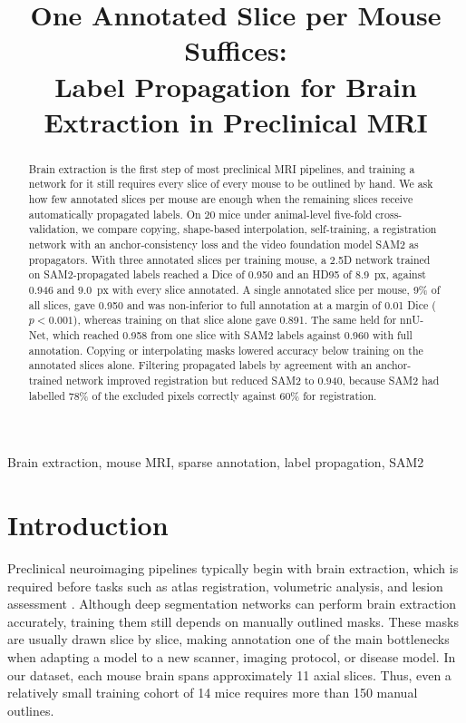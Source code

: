 \documentclass{article}
\title{One Annotated Slice per Mouse Suffices:\\Label Propagation for Brain Extraction in Preclinical MRI}
\begin{document}
\maketitle

\begin{abstract}
Brain extraction is the first step of most preclinical MRI pipelines, and training a network for it still requires every slice of every mouse to be outlined by hand. We ask how few annotated slices per mouse are enough when the remaining slices receive automatically propagated labels. On 20 mice under animal-level five-fold cross-validation, we compare copying, shape-based interpolation, self-training, a registration network with an anchor-consistency loss and the video foundation model SAM2 as propagators. With three annotated slices per training mouse, a 2.5D network trained on SAM2-propagated labels reached a Dice of 0.950 and an HD95 of 8.9~px, against 0.946 and 9.0~px with every slice annotated. A single annotated slice per mouse, 9\% of all slices, gave 0.950 and was non-inferior to full annotation at a margin of 0.01 Dice ($p<0.001$), whereas training on that slice alone gave 0.891. The same held for nnU-Net, which reached 0.958 from one slice with SAM2 labels against 0.960 with full annotation. Copying or interpolating masks lowered accuracy below training on the annotated slices alone. Filtering propagated labels by agreement with an anchor-trained network improved registration but reduced SAM2 to 0.940, because SAM2 had labelled 78\% of the excluded pixels correctly against 60\% for registration.
\end{abstract}

\begin{keywords}
Brain extraction, mouse MRI, sparse annotation, label propagation, SAM2
\end{keywords}

\section{Introduction}
\label{sec:intro}

Preclinical neuroimaging pipelines typically begin with brain extraction, which is required before tasks such as atlas registration, volumetric analysis, and lesion assessment \cite{hsu2020skullstripping, defeo2021munet}. Although deep segmentation networks can perform brain extraction accurately, training them still depends on manually outlined masks. These masks are usually drawn slice by slice, making annotation one of the main bottlenecks when adapting a model to a new scanner, imaging protocol, or disease model. In our dataset, each mouse brain spans approximately 11 axial slices. Thus, even a relatively small training cohort of 14 mice requires more than 150 manual outlines.
\end{document}
